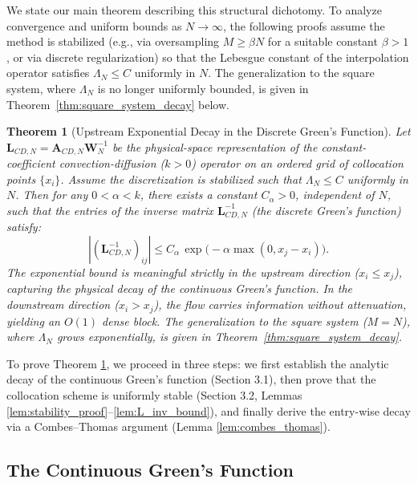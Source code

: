 \documentclass[pdflatex,sn-mathphys-num]{sn-jnl}%
\theoremstyle{thmstyleone}%
\newtheorem{theorem}{Theorem}
\newcommand{\mat}[1]{\mathbf{#1}}
\begin{document}
We state our main theorem describing this structural dichotomy. To analyze convergence and uniform bounds as $N \to \infty$, the following proofs assume the method is stabilized (e.g., via oversampling $M \ge \beta N$ for a suitable constant $\beta > 1$, or via discrete regularization) so that the Lebesgue constant of the interpolation operator satisfies $\Lambda_N \le C$ uniformly in $N$. The generalization to the square system, where $\Lambda_N$ is no longer uniformly bounded, is given in Theorem~\ref{thm:square_system_decay} below.

\begin{theorem}[Upstream Exponential Decay in the Discrete Green's Function]
\label{thm:exp_decay_cd}
Let $\mat{L}_{CD,N} = \mat{A}_{CD,N}\mat{W}_N^{-1}$ be the physical-space representation of the constant-coefficient convection-diffusion ($k > 0$) operator on an ordered grid of collocation points $\{x_i\}$. Assume the discretization is stabilized such that $\Lambda_N \le C$ uniformly in $N$. Then for any $0 < \alpha < k$, there exists a constant $C_{\alpha} > 0$, independent of $N$, such that the entries of the inverse matrix $\mat{L}_{CD,N}^{-1}$ (the discrete Green's function) satisfy:
\begin{equation}|(\mat{L}_{CD,N}^{-1})_{ij}| \le C_{\alpha}\, \exp\bigl(-\alpha \max(0, x_j - x_i)\bigr).\end{equation}
The exponential bound is meaningful strictly in the upstream direction ($x_i \le x_j$), capturing the physical decay of the continuous Green's function. In the downstream direction ($x_i > x_j$), the flow carries information without attenuation, yielding an $O(1)$ dense block. The generalization to the square system ($M=N$), where $\Lambda_N$ grows exponentially, is given in Theorem~\ref{thm:square_system_decay}.
\end{theorem}

To prove Theorem \ref{thm:exp_decay_cd}, we proceed in three steps: we first establish the analytic decay of the continuous Green's function (Section 3.1), then prove that the collocation scheme is uniformly stable (Section 3.2, Lemmas \ref{lem:stability_proof}--\ref{lem:L_inv_bound}), and finally derive the entry-wise decay via a Combes--Thomas argument (Lemma \ref{lem:combes_thomas}).

\subsection{The Continuous Green's Function}
\end{document}
